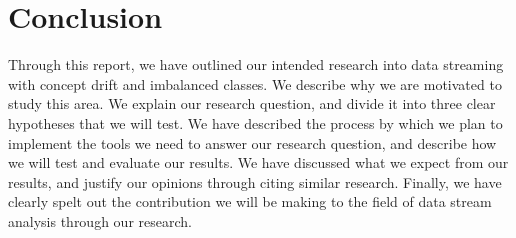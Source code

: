 \documentclass[11pt]{article}\usepackage[]{graphicx}\usepackage[]{color}
\begin{document}
\section{Conclusion}

Through this report, we have outlined our intended research into data streaming with concept drift and imbalanced classes. We describe why we are motivated to study this area. We explain our research question, and divide it into three clear hypotheses that we will test. We have described the process by which we plan to implement the tools we need to answer our research question, and describe how we will test and evaluate our results. We have discussed what we expect from our results, and justify our opinions through citing similar research. Finally, we have clearly spelt out the contribution we will be making to the field of data stream analysis through our research.

\newpage


\end{document}
